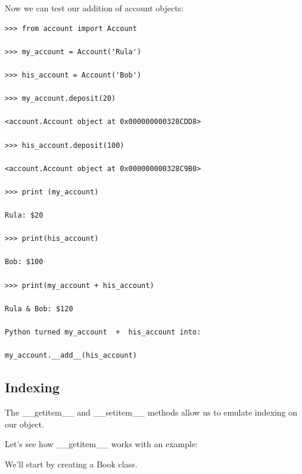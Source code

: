 \documentclass{article}
\begin{document}
Now we can test our addition of account objects:
\begin{lstlisting}
>>> from account import Account

>>> my_account = Account('Rula')

>>> his_account = Account('Bob')

>>> my_account.deposit(20)

<account.Account object at 0x000000000328CDD8>

>>> his_account.deposit(100)

<account.Account object at 0x000000000328C9B0>

>>> print (my_account)

Rula: $20

>>> print(his_account)

Bob: $100

>>> print(my_account + his_account)

Rula & Bob: $120

Python turned my_account  +  his_account into:

my_account.__add__(his_account)
\end{lstlisting}

\subsection{Indexing}

The {\_}{\_}getitem{\_}{\_}  and {\_}{\_}setitem{\_}{\_} methods allow us to emulate indexing on our object.  

Let's see how {\_}{\_}getitem{\_}{\_} works with an example:

We'll start by creating a Book class. 
\end{document}
